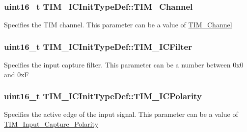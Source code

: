 \subsubsection[{\texorpdfstring{T\+I\+M\+\_\+\+Channel}{TIM_Channel}}]{\setlength{\rightskip}{0pt plus 5cm}uint16\+\_\+t T\+I\+M\+\_\+\+I\+C\+Init\+Type\+Def\+::\+T\+I\+M\+\_\+\+Channel}\hypertarget{struct_t_i_m___i_c_init_type_def_ab9404ee3d95aaa7a478ed99562c736d2}{}\label{struct_t_i_m___i_c_init_type_def_ab9404ee3d95aaa7a478ed99562c736d2}
Specifies the T\+IM channel. This parameter can be a value of \hyperlink{group___t_i_m___channel}{T\+I\+M\+\_\+\+Channel} 
\subsubsection[{\texorpdfstring{T\+I\+M\+\_\+\+I\+C\+Filter}{TIM_ICFilter}}]{\setlength{\rightskip}{0pt plus 5cm}uint16\+\_\+t T\+I\+M\+\_\+\+I\+C\+Init\+Type\+Def\+::\+T\+I\+M\+\_\+\+I\+C\+Filter}\hypertarget{struct_t_i_m___i_c_init_type_def_a72539caa6e965e4fa89e3b21b188cf26}{}\label{struct_t_i_m___i_c_init_type_def_a72539caa6e965e4fa89e3b21b188cf26}
Specifies the input capture filter. This parameter can be a number between 0x0 and 0xF 
\subsubsection[{\texorpdfstring{T\+I\+M\+\_\+\+I\+C\+Polarity}{TIM_ICPolarity}}]{\setlength{\rightskip}{0pt plus 5cm}uint16\+\_\+t T\+I\+M\+\_\+\+I\+C\+Init\+Type\+Def\+::\+T\+I\+M\+\_\+\+I\+C\+Polarity}\hypertarget{struct_t_i_m___i_c_init_type_def_a234c284efc36c0cc15a2ed0fb4435557}{}\label{struct_t_i_m___i_c_init_type_def_a234c284efc36c0cc15a2ed0fb4435557}
Specifies the active edge of the input signal. This parameter can be a value of \hyperlink{group___t_i_m___input___capture___polarity}{T\+I\+M\+\_\+\+Input\+\_\+\+Capture\+\_\+\+Polarity} 
